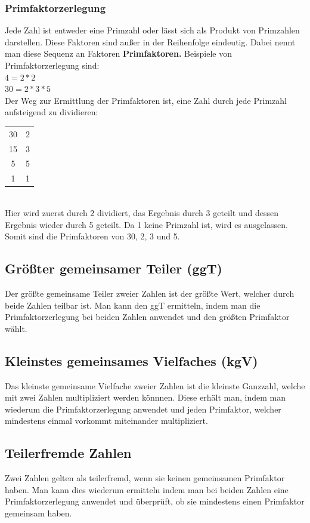 \documentclass{article}
\begin{document}
	\subsubsection{Primfaktorzerlegung}
	Jede Zahl ist entweder eine Primzahl oder lässt sich als Produkt von Primzahlen darstellen. Diese Faktoren sind außer in der Reihenfolge eindeutig. Dabei nennt man diese Sequenz an Faktoren \textbf{Primfaktoren.} Beispiele von Primfaktorzerlegung sind:\\
	$4=2*2$ \\
	$30=2*3*5$ \\
	Der Weg zur Ermittlung der Primfaktoren ist, eine Zahl durch jede Primzahl aufsteigend zu dividieren:\\
	\begin{tabular}{ c | c }
	 	30 & 2 \\
	 	15 & 3 \\
	 	5 & 5 \\
	 	1 & 1 \\
	 \end{tabular}  \\
	 Hier wird zuerst durch 2 dividiert, das Ergebnis durch 3 geteilt und dessen Ergebnis wieder durch 5 geteilt. Da 1 keine Primzahl ist, wird es ausgelassen. Somit sind die Primfaktoren von 30, 2, 3 und 5.
	 \subsection{Größter gemeinsamer Teiler (ggT)}
	 Der größte gemeinsame Teiler zweier Zahlen ist der größte Wert, welcher durch beide Zahlen teilbar ist. Man kann den ggT ermitteln, indem man die Primfaktorzerlegung bei beiden Zahlen anwendet und den größten Primfaktor wählt.
	 \subsection{Kleinstes gemeinsames Vielfaches (kgV)}
	 Das kleinste gemeinsame Vielfache zweier Zahlen ist die kleinste Ganzzahl, welche mit zwei Zahlen multipliziert werden könnnen. Diese erhält man, indem man wiederum die Primfaktorzerlegung anwendet und jeden Primfaktor, welcher mindestens einmal vorkommt miteinander multipliziert.
	 \subsection{Teilerfremde Zahlen}
	 Zwei Zahlen gelten als teilerfremd, wenn sie keinen gemeinsamen Primfaktor haben. Man kann dies wiederum ermitteln indem man bei beiden Zahlen eine Primfaktorzerlegung anwendet und überprüft, ob sie mindestens einen Primfaktor gemeinsam haben.
\end{document}
